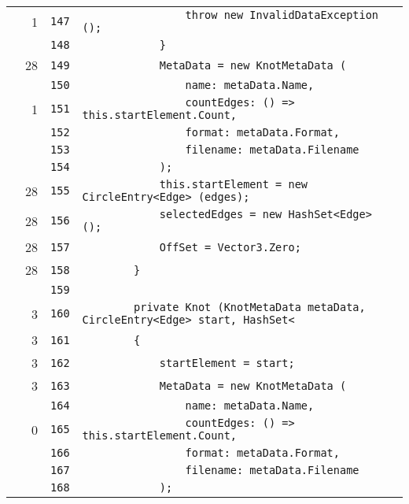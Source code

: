\documentclass[a4paper,10pt]{article}
\begin{document}
\begin{longtable}[l]{lrrl}
\cellcolor{green} & 1 & \verb~147~ & \verb~                throw new InvalidDataException ();~\\
\cellcolor{gray} &  & \verb~148~ & \verb~            }~\\
\cellcolor{green} & 28 & \verb~149~ & \verb~            MetaData = new KnotMetaData (~\\
\cellcolor{gray} &  & \verb~150~ & \verb~                name: metaData.Name,~\\
\cellcolor{green} & 1 & \verb~151~ & \verb~                countEdges: () => this.startElement.Count,~\\
\cellcolor{gray} &  & \verb~152~ & \verb~                format: metaData.Format,~\\
\cellcolor{gray} &  & \verb~153~ & \verb~                filename: metaData.Filename~\\
\cellcolor{gray} &  & \verb~154~ & \verb~            );~\\
\cellcolor{green} & 28 & \verb~155~ & \verb~            this.startElement = new CircleEntry<Edge> (edges);~\\
\cellcolor{green} & 28 & \verb~156~ & \verb~            selectedEdges = new HashSet<Edge> ();~\\
\cellcolor{green} & 28 & \verb~157~ & \verb~            OffSet = Vector3.Zero;~\\
\cellcolor{green} & 28 & \verb~158~ & \verb~        }~\\
\cellcolor{gray} &  & \verb~159~ & \verb~~\\
\cellcolor{green} & 3 & \verb~160~ & \verb~        private Knot (KnotMetaData metaData, CircleEntry<Edge> start, HashSet<~\\
\cellcolor{green} & 3 & \verb~161~ & \verb~        {~\\
\cellcolor{green} & 3 & \verb~162~ & \verb~            startElement = start;~\\
\cellcolor{green} & 3 & \verb~163~ & \verb~            MetaData = new KnotMetaData (~\\
\cellcolor{gray} &  & \verb~164~ & \verb~                name: metaData.Name,~\\
\cellcolor{red} & 0 & \verb~165~ & \verb~                countEdges: () => this.startElement.Count,~\\
\cellcolor{gray} &  & \verb~166~ & \verb~                format: metaData.Format,~\\
\cellcolor{gray} &  & \verb~167~ & \verb~                filename: metaData.Filename~\\
\cellcolor{gray} &  & \verb~168~ & \verb~            );~\\

\end{longtable}
\end{document}
